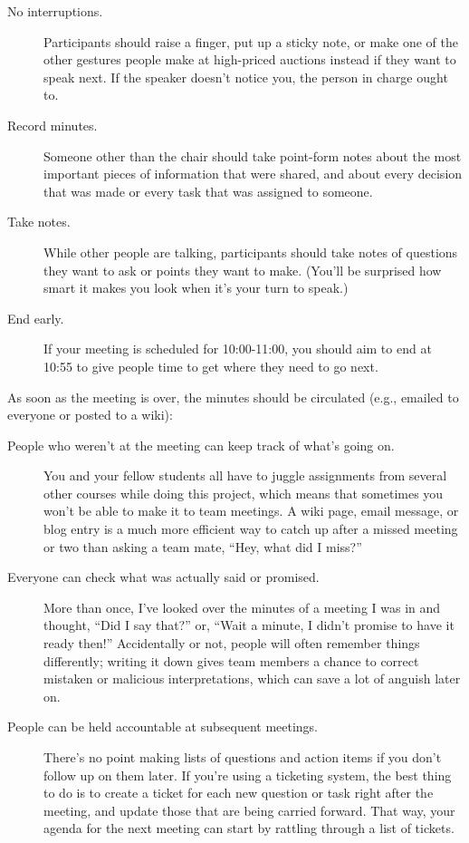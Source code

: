 \begin{description}
\item[No interruptions.] Participants should raise a finger, put up a
  sticky note, or make one of the other gestures people make at
  high-priced auctions instead if they want to speak next.  If the
  speaker doesn't notice you, the person in charge ought to.

\item[Record minutes.] Someone other than the chair should take
  point-form notes about the most important pieces of information that
  were shared, and about every decision that was made or every task
  that was assigned to someone.

\item[Take notes.]  While other people are talking, participants
  should take notes of questions they want to ask or points they want
  to make.  (You'll be surprised how smart it makes you look when it's
  your turn to speak.)

\item[End early.] If your meeting is scheduled for 10:00-11:00, you
  should aim to end at 10:55 to give people time to get where they
  need to go next.

\end{description}

\noindent
As soon as the meeting is over, the minutes should be circulated
(e.g., emailed to everyone or posted to a wiki):

\begin{description}

\item[People who weren't at the meeting can keep track of what's going
  on.]  You and your fellow students all have to juggle assignments
  from several other courses while doing this project, which means
  that sometimes you won't be able to make it to team meetings.  A
  wiki page, email message, or blog entry is a much more efficient way
  to catch up after a missed meeting or two than asking a team mate,
  ``Hey, what did I miss?''

\item[Everyone can check what was actually said or promised.]  More
  than once, I've looked over the minutes of a meeting I was in and
  thought, ``Did I say that?'' or, ``Wait a minute, I didn't promise
  to have it ready then!''  Accidentally or not, people will often
  remember things differently; writing it down gives team members a
  chance to correct mistaken or malicious interpretations, which can
  save a lot of anguish later on.

\item[People can be held accountable at subsequent meetings.]  There's
  no point making lists of questions and action items if you don't
  follow up on them later.  If you're using a ticketing system, the
  best thing to do is to create a ticket for each new question or task
  right after the meeting, and update those that are being carried
  forward.  That way, your agenda for the next meeting can start by
  rattling through a list of tickets.

\end{description}

